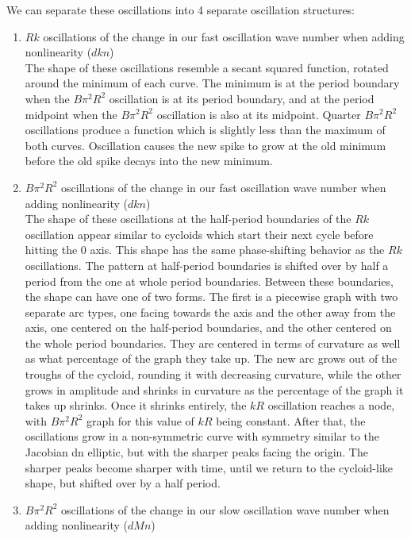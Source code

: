 \documentclass[11pt]{article}
\begin{document}
We can separate these oscillations into 4 separate oscillation
structures: 
\begin{enumerate}

\item \(Rk\) oscillations of the change in our fast oscillation
wave number when adding nonlinearity (\(dkn\))\\
The shape of these oscillations resemble a secant squared function,
rotated around the minimum of each curve. The minimum is at the period
boundary when the \(B\pi^2R^2\) oscillation is at its period boundary,
and at the period midpoint when the \(B\pi^2R^2\) oscillation is also at
its midpoint. Quarter \(B\pi^2R^2\) oscillations produce a function
which is slightly less than the maximum of both curves. Oscillation
causes the new spike to grow at the old minimum before the old spike
decays into the new minimum. 
\item \(B\pi^2R^2\) oscillations of the change
in our fast oscillation wave number when adding nonlinearity (\(dkn\))\\
The shape of these oscillations at the half-period boundaries of the
\(Rk\) oscillation appear similar to cycloids which start their next
cycle before hitting the 0 axis. This shape has the same phase-shifting
behavior as the \(Rk\) oscillations. The pattern at half-period
boundaries is shifted over by half a period from the one at whole period
boundaries. Between these boundaries, the shape can have one of two
forms. The first is a piecewise graph with two separate arc types, one
facing towards the axis and the other away from the axis, one centered
on the half-period boundaries, and the other centered on the whole
period boundaries. They are centered in terms of curvature as well as
what percentage of the graph they take up. The new arc grows out of the
troughs of the cycloid, rounding it with decreasing curvature, while the
other grows in amplitude and shrinks in curvature as the percentage of
the graph it takes up shrinks. Once it shrinks entirely, the \(kR\)
oscillation reaches a node, with \(B\pi^2R^2\) graph for this value of
\(kR\) being constant. After that, the oscillations grow in a
non-symmetric curve with symmetry similar to the Jacobian dn elliptic,
but with the sharper peaks facing the origin. The sharper peaks become
sharper with time, until we return to the cycloid-like shape, but
shifted over by a half period.
\item \(B\pi^2R^2\) oscillations of the
change in our slow oscillation wave number when adding nonlinearity
(\(dMn\))\\

\end{enumerate}
\end{document}
